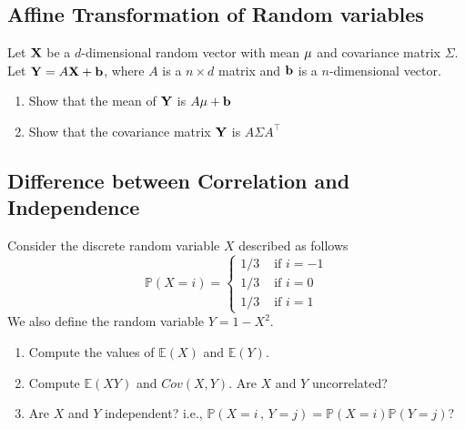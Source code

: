\subsection{Affine Transformation of Random variables}
Let ${\bf X}$ be a $d$-dimensional random vector with mean ${\bf \mu}$ and covariance matrix  $\Sigma$. Let ${\bf Y} = A{\bf X} + {\bf b}$, where $A$ is a $n \times d$ matrix and ${\bf b}$ is a $n$-dimensional vector.

\begin{enumerate}
    \item Show that the mean of ${\bf Y}$ is $A {\bf \mu } + {\bf b}$
    \item Show that the covariance matrix ${\bf Y}$ is $A \Sigma A^\top$
\end{enumerate}

\subsection{Difference between Correlation and Independence}

Consider the discrete random variable $X$ described as follows
$$ \mathbb{P}(X = i ) = \left\{ \begin{array}{ll} 1/3 & \text{ if } i = -1\\
1/3 & \text{ if } i = 0\\
1/3 & \text{ if } i = 1\end{array}\right.$$
We also define the random variable $Y = 1 - X^2$.

\begin{enumerate}
    \item Compute the values of $\mathbb{E}(X)$ and $\mathbb{E}(Y)$.
    \item Compute $\mathbb{E}(XY)$ and $Cov(X,Y)$. Are $X$ and $Y$ uncorrelated?
    \item Are $X$ and $Y$ independent? i.e., $\mathbb{P}(X = i\, , \, Y=j) = \mathbb{P}(X = i) \mathbb{P}(Y =j)$?
\end{enumerate}
\fi




